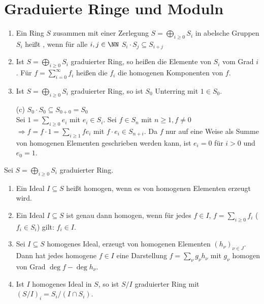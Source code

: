 \section{Graduierte Ringe und Moduln}

\begin{DefBem}
\label{2.13}

\begin{enumerate}

\item Ein Ring $S$ zusammen mit einer Zerlegung $S=\bigoplus_{i\geq 0}S_i$
in abelsche Gruppen $S_i$ hei\ss t , wenn f\"ur alle $i, j\in \NN$
$S_i\cdot S_j\subseteq S_{i+j}$

\item Ist $S=\bigoplus_{i\geq 0} S_i$ graduierter Ring, so hei\ss en die Elemente
von $S_i$  vom Grad $i$.
F\"ur $f=\sum_{i=0}^{\infty} f_i$ hei\ss en die $f_i$ die homogenen Komponenten von $f$.

\item Ist $S=\bigoplus_{i\geq 0} S_i$ graduierter Ring, so ist $S_0$ Unterring mit $1\in S_0$.
\end{enumerate}

\end{DefBem}

\begin{Bew}
\begin{enumerate}
\item[(c)] $S_0\cdot S_0\subseteq S_{0+0}=S_0$\\
Sei $1=\sum_{i\geq 0}e_i$ mit $e_i\in S_i$. Sei $f\in S_n$ mit $n\geq 1, f\neq 0$
$\Rightarrow f=f\cdot 1 = \sum_{i\geq 1}fe_i$ mit $f\cdot e_i\in S_{n+i}$.
Da $f$ nur auf eine Weise als Summe von homogenen Elementen geschrieben werden
kann, ist $e_i=0$ f\"ur $i> 0$ und $e_0=1$.

\end{enumerate}
\end{Bew}

\begin{DefBem}
\label{2.14}
Sei $S=\bigoplus_{i\geq 0} S_i$ graduierter Ring.
\begin{enumerate}
\item Ein Ideal $I\subseteq S$ hei\ss t homogen, wenn es von homogenen Elementen erzeugt wird.
\item\label{2.14b} Ein Ideal $I\subseteq S$ ist genau dann homogen, wenn
f\"ur jedes $f\in I$, $f=\sum_{i\geq 0} f_i$ ($f_i\in S_i$) gilt: $f_i\in I$.

\item Sei $I\subseteq S$ homogenes Ideal, erzeugt von homogenen Elementen $(h_\nu)_{\nu\in J}$.
Dann hat jedes homogene $f\in I$ eine Darstellung $f=\sum_{\nu}g_\nu h_\nu$ mit $g_\nu$ 
homogen von Grad $\deg f - \deg{h_\nu}$.

\item Ist $I$ homogenes Ideal in $S$, so ist $S/I$ graduierter Ring mit
$(S/I)_i=S_i/(I\cap S_i)$.

\end{enumerate}
\end{DefBem}


